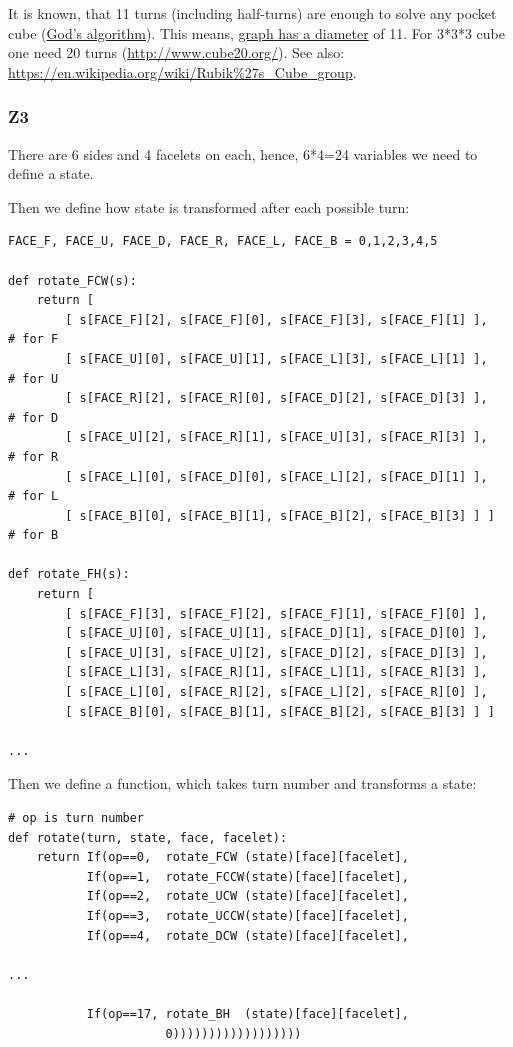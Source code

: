 It is known, that 11 turns (including half-turns) are enough to solve any pocket cube
(\href{https://en.wikipedia.org/wiki/Optimal_solutions_for_Rubik%27s_Cube}{God’s algorithm}).
This means, \href{http://mathworld.wolfram.com/GraphDiameter.html}{graph has a diameter} of 11.
For 3*3*3 cube one need 20 turns (\url{http://www.cube20.org/}).
See also: \url{https://en.wikipedia.org/wiki/Rubik%27s_Cube_group}.

\subsubsection{Z3}

There are 6 sides and 4 facelets on each, hence, 6*4=24 variables we need to define a state.

Then we define how state is transformed after each possible turn:

\begin{lstlisting}
FACE_F, FACE_U, FACE_D, FACE_R, FACE_L, FACE_B = 0,1,2,3,4,5

def rotate_FCW(s):
    return [
        [ s[FACE_F][2], s[FACE_F][0], s[FACE_F][3], s[FACE_F][1] ],   # for F
        [ s[FACE_U][0], s[FACE_U][1], s[FACE_L][3], s[FACE_L][1] ],   # for U
        [ s[FACE_R][2], s[FACE_R][0], s[FACE_D][2], s[FACE_D][3] ],   # for D
        [ s[FACE_U][2], s[FACE_R][1], s[FACE_U][3], s[FACE_R][3] ],   # for R
        [ s[FACE_L][0], s[FACE_D][0], s[FACE_L][2], s[FACE_D][1] ],   # for L
        [ s[FACE_B][0], s[FACE_B][1], s[FACE_B][2], s[FACE_B][3] ] ]  # for B

def rotate_FH(s):
    return [
        [ s[FACE_F][3], s[FACE_F][2], s[FACE_F][1], s[FACE_F][0] ],
        [ s[FACE_U][0], s[FACE_U][1], s[FACE_D][1], s[FACE_D][0] ],
        [ s[FACE_U][3], s[FACE_U][2], s[FACE_D][2], s[FACE_D][3] ],
        [ s[FACE_L][3], s[FACE_R][1], s[FACE_L][1], s[FACE_R][3] ],
        [ s[FACE_L][0], s[FACE_R][2], s[FACE_L][2], s[FACE_R][0] ],
        [ s[FACE_B][0], s[FACE_B][1], s[FACE_B][2], s[FACE_B][3] ] ]

...
\end{lstlisting}

Then we define a function, which takes turn number and transforms a state:

\begin{lstlisting}
# op is turn number
def rotate(turn, state, face, facelet):
    return If(op==0,  rotate_FCW (state)[face][facelet],
           If(op==1,  rotate_FCCW(state)[face][facelet],
           If(op==2,  rotate_UCW (state)[face][facelet],
           If(op==3,  rotate_UCCW(state)[face][facelet],
           If(op==4,  rotate_DCW (state)[face][facelet],

...

           If(op==17, rotate_BH  (state)[face][facelet],
                      0))))))))))))))))))
\end{lstlisting}

